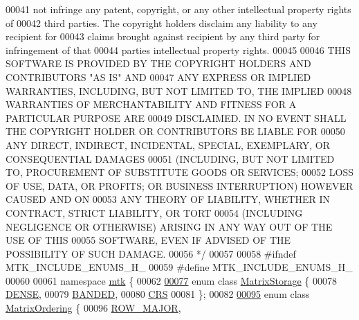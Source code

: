 \begin{DoxyCode}
00041 \textcolor{comment}{not infringe any patent, copyright, or any other intellectual property rights of}
00042 \textcolor{comment}{third parties. The copyright holders disclaim any liability to any recipient for}
00043 \textcolor{comment}{claims brought against recipient by any third party for infringement of that}
00044 \textcolor{comment}{parties intellectual property rights.}
00045 \textcolor{comment}{}
00046 \textcolor{comment}{THIS SOFTWARE IS PROVIDED BY THE COPYRIGHT HOLDERS AND CONTRIBUTORS "AS IS" AND}
00047 \textcolor{comment}{ANY EXPRESS OR IMPLIED WARRANTIES, INCLUDING, BUT NOT LIMITED TO, THE IMPLIED}
00048 \textcolor{comment}{WARRANTIES OF MERCHANTABILITY AND FITNESS FOR A PARTICULAR PURPOSE ARE}
00049 \textcolor{comment}{DISCLAIMED. IN NO EVENT SHALL THE COPYRIGHT HOLDER OR CONTRIBUTORS BE LIABLE FOR}
00050 \textcolor{comment}{ANY DIRECT, INDIRECT, INCIDENTAL, SPECIAL, EXEMPLARY, OR CONSEQUENTIAL DAMAGES}
00051 \textcolor{comment}{(INCLUDING, BUT NOT LIMITED TO, PROCUREMENT OF SUBSTITUTE GOODS OR SERVICES;}
00052 \textcolor{comment}{LOSS OF USE, DATA, OR PROFITS; OR BUSINESS INTERRUPTION) HOWEVER CAUSED AND ON}
00053 \textcolor{comment}{ANY THEORY OF LIABILITY, WHETHER IN CONTRACT, STRICT LIABILITY, OR TORT}
00054 \textcolor{comment}{(INCLUDING NEGLIGENCE OR OTHERWISE) ARISING IN ANY WAY OUT OF THE USE OF THIS}
00055 \textcolor{comment}{SOFTWARE, EVEN IF ADVISED OF THE POSSIBILITY OF SUCH DAMAGE.}
00056 \textcolor{comment}{*/}
00057 
00058 \textcolor{preprocessor}{#ifndef MTK\_INCLUDE\_ENUMS\_H\_}
00059 \textcolor{preprocessor}{#define MTK\_INCLUDE\_ENUMS\_H\_}
00060 
00061 \textcolor{keyword}{namespace }\hyperlink{namespacemtk}{mtk} \{
00062 
\hypertarget{mtk__enums_8h_source_l00077}{}\hyperlink{group__c02-enums_ga25b67ec6a2afeee69f9bb196a9c66619}{00077} \textcolor{keyword}{enum class} \hyperlink{group__c02-enums_ga25b67ec6a2afeee69f9bb196a9c66619}{MatrixStorage} \{
00078   \hyperlink{namespacemtk_ga25b67ec6a2afeee69f9bb196a9c66619a0706fbbd929bd8abc4de386c53d439ff}{DENSE},    
00079   \hyperlink{namespacemtk_ga25b67ec6a2afeee69f9bb196a9c66619a710800eb2f07821684373493be7fee14}{BANDED},   
00080   \hyperlink{namespacemtk_ga25b67ec6a2afeee69f9bb196a9c66619a22d51ee0c812123c541f2a1bdf794fd1}{CRS}       
00081 \};
00082 
\hypertarget{mtk__enums_8h_source_l00095}{}\hyperlink{group__c02-enums_ga622801bd9f912d0f976c3e383f5f581c}{00095} \textcolor{keyword}{enum class} \hyperlink{group__c02-enums_ga622801bd9f912d0f976c3e383f5f581c}{MatrixOrdering} \{
00096   \hyperlink{namespacemtk_ga622801bd9f912d0f976c3e383f5f581ca21541962976d7709c26e9cd8385bd648}{ROW\_MAJOR},  

\end{DoxyCode}
